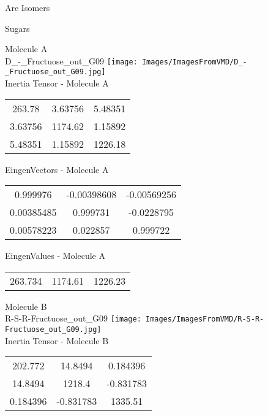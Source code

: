 \begin{center}
\vtab
\vtab
\textcolor{NavyBlue}{\Large Are Isomers}
\end{center}
\newpage

\vtab[-2cm]
\begin{center}
{\large Sugars}
\end{center}
\begin{multicols}{2}
\begin{center}
Molecule A \\ 
D\_-\_Fructuose\_out\_G09
\texttt{[image: Images/ImagesFromVMD/D\_-\_Fructuose\_out\_G09.jpg]}
\\
Inertia Tensor - Molecule A \\
\vtab
\begin{tabular}{|c c c|}
263.78	 & 	3.63756	 & 	5.48351	 \\
3.63756	 & 	1174.62	 & 	1.15892	 \\
5.48351	 & 	1.15892	 & 	1226.18
\end{tabular}

\vtab
 EingenVectors - Molecule A     \\
\vtab
\begin{tabular}{|c c c|}
0.999976	 & 	-0.00398608	 & 	-0.00569256	 \\
0.00385485	 & 	0.999731	 & 	-0.0228795	 \\
0.00578223	 & 	0.022857	 & 	0.999722
\end{tabular}

\vtab
 EingenValues - Molecule A     \\
\vtab
\begin{tabular}{|c c c|}
263.734	 & 	1174.61	 & 	1226.23
\end{tabular}
\columnbreak

Molecule B \\ 
R-S-R-Fructuose\_out\_G09
\texttt{[image: Images/ImagesFromVMD/R-S-R-Fructuose\_out\_G09.jpg]}
\\
Inertia Tensor - Molecule B \\
\vtab
\begin{tabular}{|c c c|}
202.772	 & 	14.8494	 & 	0.184396	 \\
14.8494	 & 	1218.4	 & 	-0.831783	 \\
0.184396	 & 	-0.831783	 & 	1335.51
\end{tabular}


\end{center}
\end{multicols}
